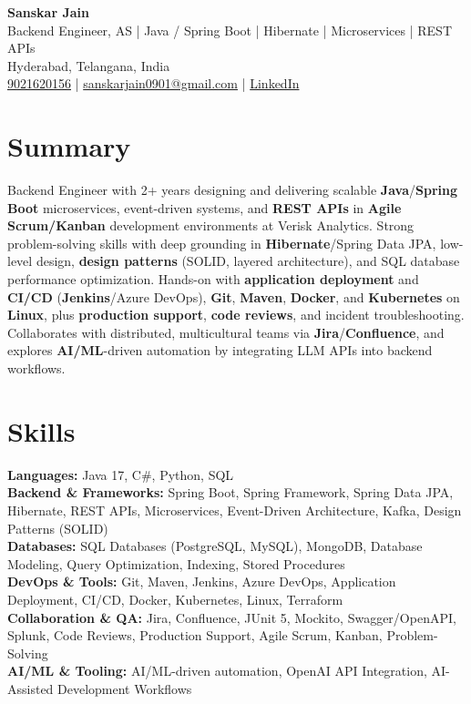 \documentclass[a4paper,10pt]{article}
\begin{document}
\begin{center}
    {\LARGE \textbf{Sanskar Jain}} \\
    Backend Engineer, AS \;|\; Java / Spring Boot \;|\; Hibernate \;|\; Microservices \;|\; REST APIs \\
    Hyderabad, Telangana, India \\
    \href{tel:9021620156}{9021620156} \;|\;
    \href{mailto:sanskarjain0901@gmail.com}{sanskarjain0901@gmail.com} \;|\;
    \href{https://www.linkedin.com/in/sanskar-jain0901/}{LinkedIn}
\end{center}

\vspace{3pt}

\section*{Summary}
Backend Engineer with 2+ years designing and delivering scalable \textbf{Java}/\textbf{Spring Boot} microservices, event-driven systems, and \textbf{REST APIs} in \textbf{Agile Scrum/Kanban} development environments at Verisk Analytics.
Strong problem-solving skills with deep grounding in \textbf{Hibernate}/Spring Data JPA, low-level design, \textbf{design patterns} (SOLID, layered architecture), and SQL database performance optimization.
Hands-on with \textbf{application deployment} and \textbf{CI/CD} (\textbf{Jenkins}/Azure DevOps), \textbf{Git}, \textbf{Maven}, \textbf{Docker}, and \textbf{Kubernetes} on \textbf{Linux}, plus \textbf{production support}, \textbf{code reviews}, and incident troubleshooting.
Collaborates with distributed, multicultural teams via \textbf{Jira}/\textbf{Confluence}, and explores \textbf{AI/ML}-driven automation by integrating LLM APIs into backend workflows.

\section*{Skills}
\textbf{Languages:} Java 17, C\#, Python, SQL \\
\textbf{Backend \& Frameworks:} Spring Boot, Spring Framework, Spring Data JPA, Hibernate, REST APIs, Microservices, Event-Driven Architecture, Kafka, Design Patterns (SOLID) \\
\textbf{Databases:} SQL Databases (PostgreSQL, MySQL), MongoDB, Database Modeling, Query Optimization, Indexing, Stored Procedures \\
\textbf{DevOps \& Tools:} Git, Maven, Jenkins, Azure DevOps, Application Deployment, CI/CD, Docker, Kubernetes, Linux, Terraform \\
\textbf{Collaboration \& QA:} Jira, Confluence, JUnit 5, Mockito, Swagger/OpenAPI, Splunk, Code Reviews, Production Support, Agile Scrum, Kanban, Problem-Solving \\
\textbf{AI/ML \& Tooling:} AI/ML-driven automation, OpenAI API Integration, AI-Assisted Development Workflows
\end{document}
